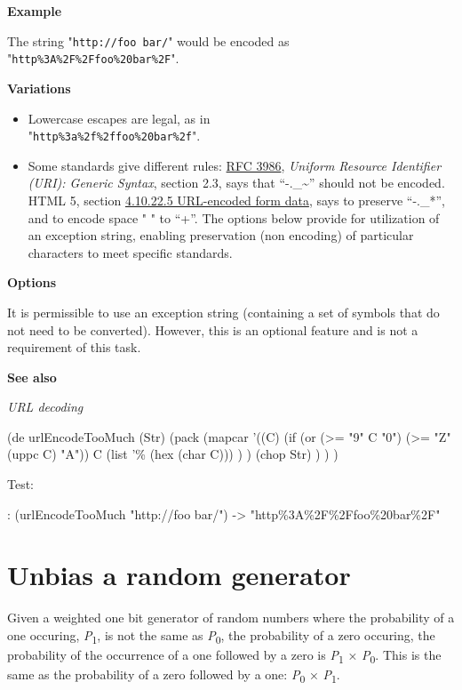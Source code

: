 \textbf{Example}

The string "\texttt{http://foo bar/}" would be encoded as \\
"\texttt{http\%3A\%2F\%2Ffoo\%20bar\%2F}".

\textbf{Variations}

\begin{itemize}
\item
  Lowercase escapes are legal, as in \\
  "\texttt{http\%3a\%2f\%2ffoo\%20bar\%2f}".
\item
  Some standards give different rules:
  \href{//tools.ietf.org/html/rfc3986}{RFC 3986}, \emph{Uniform Resource
  Identifier (URI): Generic Syntax}, section 2.3, says that
  ``-.\_\textasciitilde{}'' should not be encoded. HTML 5, section
  \href{http://www.whatwg.org/specs/web-apps/current-work/multipage/association-of-controls-and-forms.html\#url-encoded-form-data}{4.10.22.5
  URL-encoded form data}, says to preserve ``-.\_*'', and to encode
  space " " to ``+''. The options below provide for utilization of an
  exception string, enabling preservation (non encoding) of particular
  characters to meet specific standards.
\end{itemize}

\textbf{Options}

It is permissible to use an exception string (containing a set of
symbols that do not need to be converted). However, this is an optional
feature and is not a requirement of this task.

\textbf{See also}

\emph{URL decoding}


\begin{wideverbatim}

(de urlEncodeTooMuch (Str)
   (pack
      (mapcar
         '((C)
            (if (or (>= "9" C "0") (>= "Z" (uppc C) "A"))
               C
               (list '\% (hex (char C))) ) )
         (chop Str) ) ) )

Test:

: (urlEncodeTooMuch "http://foo bar/")
-> "http\%3A\%2F\%2Ffoo\%20bar\%2F"

\end{wideverbatim}

\pagebreak{}
\section*{Unbias a random generator}

Given a weighted one bit generator of random numbers where the
probability of a one occuring, \emph{P}\textsubscript{1}, is not the
same as \emph{P}\textsubscript{0}, the probability of a zero occuring,
the probability of the occurrence of a one followed by a zero is
\emph{P}\textsubscript{1} × \emph{P}\textsubscript{0}. This is the same
as the probability of a zero followed by a one:
\emph{P}\textsubscript{0} × \emph{P}\textsubscript{1}.


